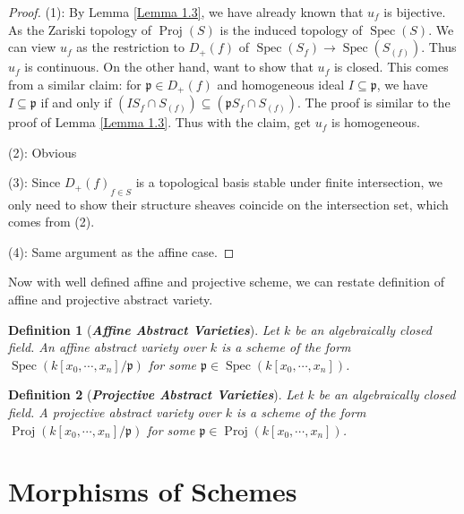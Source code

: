 \documentclass{ctexart}
\newtheorem{definition}{Definition}[section]
\newcommand{\spec}{\operatorname{Spec}}
\newcommand{\proj}{\operatorname{Proj}}
\begin{document}
\begin{proof}
    (1): By Lemma \ref{Lemma 1.3}, we have already known that $u_{f}$ is bijective. 
    As the Zariski topology of $\proj(S)$ is the induced topology of $\spec(S)$.
    We can view $u_{f}$ as the restriction to $D_{+}(f)$ of $\spec(S_{f}) \longrightarrow \spec(S_{(f)})$.
    Thus $u_{f}$ is continuous.
    On the other hand, want to show that $u_{f}$ is closed.
    This comes from a similar claim:
    for $\mathfrak{p}\in D_{+}(f)$ and homogeneous ideal $I \subseteq \mathfrak{p}$, we have $I \subseteq \mathfrak{p}$ if and only if $(IS_{f} \cap S_{(f)}) \subseteq (\mathfrak{p}S_{f} \cap S_{(f)})$.
    The proof is similar to the proof of Lemma \ref{Lemma 1.3}.
    Thus with the claim, get $u_{f}$ is homogeneous. 
    \par
    (2): Obvious 
    \par
    (3): Since ${D_{+}(f)}_{f\in S}$ is a topological basis stable under finite intersection, 
    we only need to show their structure sheaves coincide on the intersection set, which comes from (2). 
    \par
    (4): Same argument as the affine case.
\end{proof}
Now with well defined affine and projective scheme, we can restate definition of affine and projective abstract variety.
\begin{definition}[\textbf{\emph{Affine Abstract Varieties}}]
    Let $k$ be an algebraically closed field.
    An affine abstract variety over $k$ is a scheme of the form $\spec(k[x_{0}, \cdots, x_{n}]/\mathfrak{p})$ for some $\mathfrak{p}\in \spec(k[x_{0}, \cdots, x_{n}])$.
\end{definition}
\begin{definition}[\textbf{\emph{Projective Abstract Varieties}}]
    Let $k$ be an algebraically closed field.
    A projective abstract variety over $k$ is a scheme of the form $\proj(k[x_{0}, \cdots, x_{n}]/\mathfrak{p})$ for some $\mathfrak{p}\in \proj(k[x_{0}, \cdots, x_{n}])$.
\end{definition}

\section{Morphisms of Schemes}
\label{section:Morphisms_of_Schemes}
\end{document}
